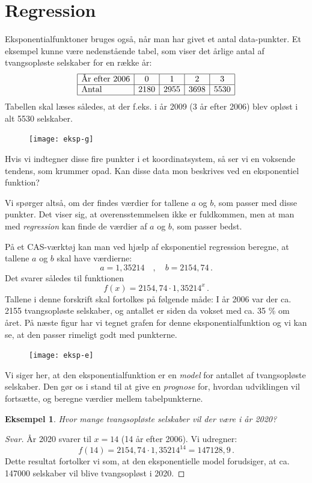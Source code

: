 \documentclass[12pt,oneside,a4paper]{article}
\theoremstyle{plain}
\newtheorem*{eks}{Eksempel}
\begin{document}
\section*{Regression}
Eksponentialfunktoner bruges også, når man har givet et antal
data-punkter. Et eksempel kunne være nedenstående tabel, som viser det årlige
antal af tvangsopløste selskaber for en række år:
$$
\begin{array}{|l|c|c|c|c|}
    \hline
    \mbox{År efter 2006} & 0 & 1 & 2 & 3 \\
    \hline
    \mbox{Antal} & 2180 & 2955 & 3698 & 5530 \\
    \hline
\end{array}
$$
Tabellen skal læses således, at der f.eks. i år 2009 (3 år efter 2006) blev
opløst i alt 5530 selskaber.

\begin{figure}[ht]
    \centering
    \texttt{[image: eksp-g]}
\end{figure}

Hvis vi indtegner disse fire punkter i et koordinatsystem, så ser vi en
voksende tendens, som krummer opad. Kan disse data mon beskrives ved en
eksponentiel funktion?

Vi spørger altså, om der findes værdier for tallene $a$ og $b$, som passer med
disse punkter. Det viser sig, at overensstemmelsen ikke er fuldkommen, men at man
med {\em regression} kan finde de værdier af $a$ og $b$, som passer bedst.

På et CAS-værktøj kan man ved hjælp af eksponentiel regression beregne, at
tallene $a$ og $b$ skal have værdierne: 
$$
a = 1,35214\quad,\quad b = 2154,74\,.
$$
Det svarer således til funktionen 
$$
f(x) = 2154,74 \cdot 1,35214 ^x\,.
$$
Tallene i denne forskrift skal fortolkes på følgende måde: I år 2006 var der
ca. 2155 tvangsopløste selskaber, og antallet er siden da vokset med ca. 35 \%
om året.  På næste figur har vi tegnet grafen for denne eksponentialfunktion
og vi kan se, at den passer rimeligt godt med punkterne.

\begin{figure}[ht]
    \centering
    \texttt{[image: eksp-e]}
    \label{eksp-e}
\end{figure}

Vi siger her, at den eksponentialfunktion er en {\em model} for antallet af
tvangsopløste selskaber. Den gør os i stand til at give en {\em prognose} for, hvordan
udviklingen vil fortsætte, og beregne værdier mellem tabelpunkterne.

\begin{eks}
    Hvor mange tvangsopløste selskaber vil der være i år 2020?
\end{eks}
\begin{proof}[Svar]
    År 2020 svarer til $x=14$ (14 år efter 2006). Vi udregner:
    $$
    f(14) = 2154,74 \cdot 1,35214^{14} = 147128,9\,.
    $$
    Dette resultat fortolker vi som, at den eksponentielle
    model forudsiger, at ca. 147000 selskaber vil blive tvangsopløst i 2020.
\end{proof}
    
\end{document}
